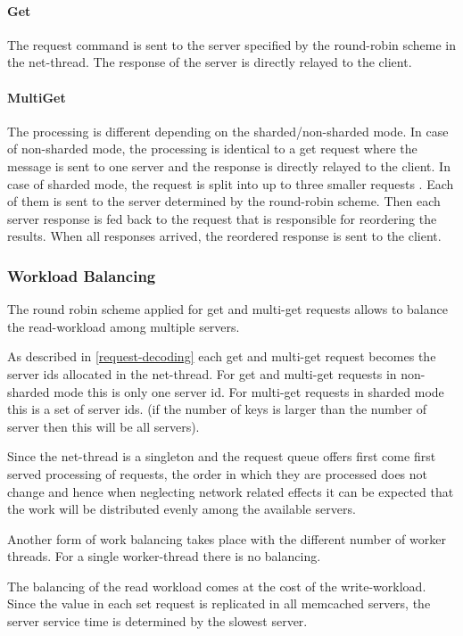 \documentclass[11pt,a4paper]{article}
\begin{document}
\paragraph{Get} The request command is sent to the server specified by the round-robin scheme in the net-thread.
The response of the server is directly relayed to the client.

\paragraph{MultiGet} The processing is different depending on the sharded/non-sharded mode. In case of non-sharded mode, the processing is identical to a get request where the message is sent to one server and the response is directly relayed to the client. In case of sharded mode, the request is split into up to three smaller requests . Each of them is sent to the server determined by the round-robin scheme. Then each server response is fed back to the request that is responsible for reordering the results. When all responses arrived, the reordered response is sent to the client.

\subsubsection{Workload Balancing}\label{workload-balancing}
The round robin scheme applied for get and multi-get requests allows to balance the read-workload among multiple servers.

As described in \ref{request-decoding} each get and multi-get request becomes the server ids allocated in the net-thread.
For get and multi-get requests in non-sharded mode this is only one server id. For multi-get requests in sharded mode this is a set of server ids. (if the number of keys is larger than the number of server then this will be all servers).

Since the net-thread is a singleton and the request queue offers first come first served processing of requests, the order in which they are processed does not change and hence when neglecting network related effects it can be expected that the work will be distributed evenly among the available servers.

Another form of work balancing takes place with the different number of worker threads. For a single worker-thread there is no balancing. 

The balancing of the read workload comes at the cost of the write-workload. Since the value in each set request is replicated in all memcached servers, the server service time is determined by the slowest server. 
\end{document}
